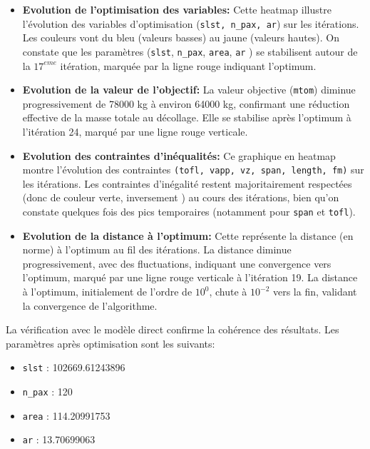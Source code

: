 \documentclass[a4paper, 11pt]{article}
\begin{document}
\begin{itemize}

    \item \textbf{Evolution de l'optimisation des variables:} Cette heatmap illustre l'évolution des variables d'optimisation (\texttt{slst, n\_pax, ar}) sur les itérations. Les couleurs vont du bleu (valeurs basses) au jaune (valeurs hautes). On constate que les paramètres (\texttt{slst}, \texttt{n\_pax}, \texttt{area}, \texttt{ar} ) se stabilisent autour de la $17^{eme}$ itération, marquée par la ligne rouge indiquant l'optimum.

    \item \textbf{Evolution de la valeur de l'objectif:} La valeur objective (\texttt{mtom}) diminue progressivement de 78000 kg à environ 64000 kg, confirmant une réduction effective de la masse totale au décollage. Elle se stabilise après l'optimum à l'itération 24, marqué par une ligne rouge verticale.

    \item \textbf{Evolution des contraintes d'inéqualités:} Ce graphique en heatmap montre l'évolution des contraintes \texttt{(tofl, vapp, vz, span, length, fm)} sur les itérations. Les contraintes d'inégalité restent majoritairement respectées (donc de couleur verte, inversement ) au cours des itérations, bien qu'on constate quelques fois des pics temporaires (notamment pour \texttt{span} et \texttt{tofl}).
    
    \item \textbf{Evolution de la distance à l'optimum:} Cette représente la distance (en norme) à l'optimum au fil des itérations.  La distance diminue progressivement, avec des fluctuations, indiquant une convergence vers l'optimum, marqué par une ligne rouge verticale à l'itération 19. La distance à l'optimum, initialement de l'ordre de $10^0$, chute à $10^{-2}$ vers la fin, validant la convergence de l'algorithme. 

\end{itemize}

La vérification avec le modèle direct confirme la cohérence des résultats.
Les paramètres après optimisation sont les suivants:
\begin{itemize}
    \item \texttt{slst} : 102669.61243896
    \item \texttt{n\_pax} : 120
    \item \texttt{area} : 114.20991753
    \item \texttt{ar} : 13.70699063
\end{itemize}
\end{document}
